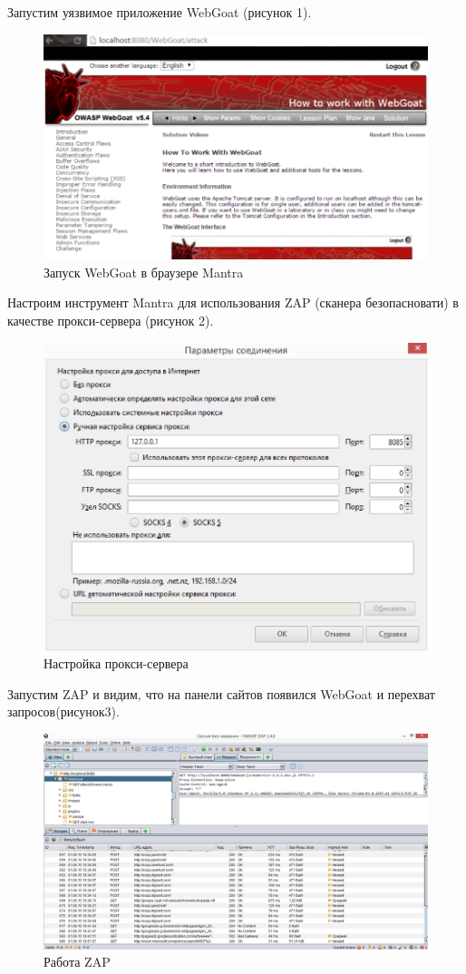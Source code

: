 \documentclass[10pt,a4paper]{article}
\begin{document}
Запустим уязвимое приложение WebGoat (рисунок 1).
\FloatBarrier
\begin{figure}[h!]
\centering
\includegraphics[scale=0.5]{1}
\caption{Запуск WebGoat в браузере Mantra}
\end{figure}
\FloatBarrier
Настроим инструмент Mantra для использования ZAP (сканера безопасновати) в качестве прокси-сервера (рисунок 2).
\FloatBarrier
\begin{figure}[h!]
\centering
\includegraphics[scale=0.5]{2}
\caption{Настройка прокси-сервера}
\end{figure}
\FloatBarrier
Запустим ZAP и видим, что на панели сайтов появился WebGoat и перехват запросов(рисунок3).
\FloatBarrier
\begin{figure}[h!]
\centering
\includegraphics[scale=0.4]{3}
\caption{Работа ZAP}
\end{figure}
\end{document}
